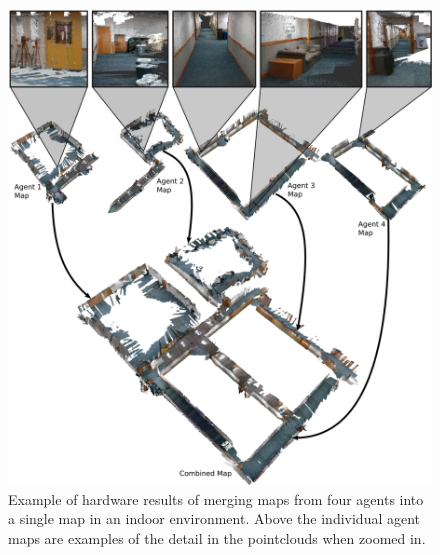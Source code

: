 \documentclass[letterpaper, 10 pt, conference]{ieeeconf}  %
\begin{document}
\begin{figure}
\centering
\includegraphics[width=1.0\linewidth]{wilk3_manual_small.png}
\caption[Map generated from four combined maps in hardware manual flight.]{Example of hardware results of merging maps from four agents into a single map in an indoor environment. Above the individual agent maps are examples of the detail in the pointclouds when zoomed in.}
\label{fig:wilk3_map}
\end{figure}
\end{document}
